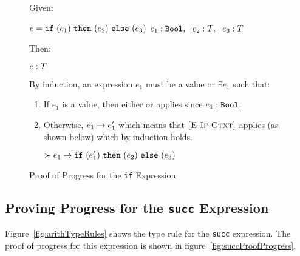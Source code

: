 \documentclass{report}
\newcommand{\rel}[1]{ \mbox{\sc [#1]} }
\begin{document}
\begin{figure}[ht!]
Given:
\begin{center}
   $e = \mbox{\tt if}~({e_1})~\mbox{\tt then}~({e_2})~\mbox{\tt else}~({e_3})$
   ${e_1} : {\mbox{\tt Bool}},~~{e_2} : {T},~~{e_3} : {T}$
\end{center}
Then:
\begin{center}
   ${e} : {T}$
\end{center}
By induction, an expression $e_1$ must be a value or $\exists e_1$ such that:
\begin{enumerate}

    \item If $e_1$ is a value, then either \rel{E-If-True} or \rel{E-If-False} applies since ${e_1} : {\mbox{\tt Bool}}$.
      
    \item Otherwise, ${e_1} \rightarrow {e'_1}$ which means that $\rel{E-If-Ctxt}$ applies (as shown below) which by induction holds.
    
    \begin{center}
      ${\succ e_1} \rightarrow {\mbox{\tt if}~({e'_1})~\mbox{\tt then}~({e_2})~\mbox{\tt else}~({e_3})}$
    \end{center}
	
	\end{enumerate}
	
  \caption{Proof of Progress for the \texttt{if} Expression}\label{fig:ifProofProgress}
\end{figure}

\eject
\subsection{Proving Progress for the \texttt{succ} Expression}

Figure~\ref{fig:arithTypeRules} shows the type rule for the \texttt{succ} expression.  The proof of progress for this expression is shown in figure~\ref{fig:succProofProgress}.
\end{document}
